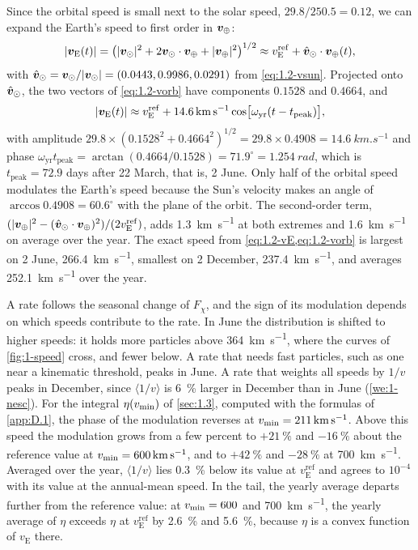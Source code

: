 Since the orbital speed is small next to the solar speed, $29.8/250.5 = 0.12$, we can expand the Earth's speed to first order in $\bm{v}_\oplus$:
\begin{equation*}
  |\bm{v}_{\mathrm{E}}(t)| = \bigl(|\bm{v}_\odot|^2 + 2\bm{v}_\odot\cdot\bm{v}_\oplus + |\bm{v}_\oplus|^2\bigr)^{1/2} \approx v_{\mathrm{E}}^{\mathrm{ref}} + \hat{\bm{v}}_\odot \cdot \bm{v}_\oplus(t),
\end{equation*}
with $\hat{\bm{v}}_\odot = \bm{v}_\odot/|\bm{v}_\odot| = (0.0443, 0.9986, 0.0291)$ from \cref{eq:1.2-vsun}. Projected onto $\hat{\bm{v}}_\odot$, the two vectors of \cref{eq:1.2-vorb} have components $0.1528$ and $0.4664$, and
\begin{equation}
  |\bm{v}_{\mathrm{E}}(t)| \approx v_{\mathrm{E}}^{\mathrm{ref}} + \SI{14.6}{km.s^{-1}} \cos\bigl[\omega_{\mathrm{yr}}(t - t_{\mathrm{peak}})\bigr],
  \label{eq:1.2-annual}
\end{equation}
with amplitude $29.8 \times (0.1528^2 + 0.4664^2)^{1/2} = 29.8 \times 0.4908 = \SI{14.6}{km.s^{-1}}$ and phase $\omega_{\mathrm{yr}} t_{\mathrm{peak}} = \arctan(0.4664/0.1528) = 71.9^\circ = \SI{1.254}{rad}$, which is $t_{\mathrm{peak}} = 72.9$ days after 22 March, that is, 2 June. Only half of the orbital speed modulates the Earth's speed because the Sun's velocity makes an angle of $\arccos 0.4908 = 60.6^\circ$ with the plane of the orbit. The second-order term, $(|\bm{v}_\oplus|^2 - (\hat{\bm{v}}_\odot\cdot\bm{v}_\oplus)^2)/(2v_{\mathrm{E}}^{\mathrm{ref}})$, adds \SI{1.3}{km.s^{-1}} at both extremes and \SI{1.6}{km.s^{-1}} on average over the year. The exact speed from \cref{eq:1.2-vE,eq:1.2-vorb} is largest on 2 June, \SI{266.4}{km.s^{-1}}, smallest on 2 December, \SI{237.4}{km.s^{-1}}, and averages \SI{252.1}{km.s^{-1}} over the year.

A rate follows the seasonal change of $F_\chi$, and the sign of its modulation depends on which speeds contribute to the rate. In June the distribution is shifted to higher speeds: it holds more particles above \SI{364}{km.s^{-1}}, where the curves of \cref{fig:1-speed} cross, and fewer below. A rate that needs fast particles, such as one near a kinematic threshold, peaks in June. A rate that weights all speeds by $1/v$ peaks in December, since $\langle 1/v \rangle$ is \SI{6}{\percent} larger in December than in June (\cref{we:1-nesc}). For the integral $\eta(v_{\mathrm{min}})$ of \cref{sec:1.3}, computed with the formulas of \cref{app:D.1}, the phase of the modulation reverses at $v_{\mathrm{min}} = \SI{211}{km.s^{-1}}$. Above this speed the modulation grows from a few percent to $+\SI{21}{\percent}$ and $\SI{-16}{\percent}$ about the reference value at $v_{\mathrm{min}} = \SI{600}{km.s^{-1}}$, and to $+\SI{42}{\percent}$ and $\SI{-28}{\percent}$ at \SI{700}{km.s^{-1}}. Averaged over the year, $\langle 1/v\rangle$ lies \SI{0.3}{\percent} below its value at $v_{\mathrm{E}}^{\mathrm{ref}}$ and agrees to $10^{-4}$ with its value at the annual-mean speed. In the tail, the yearly average departs further from the reference value: at $v_{\mathrm{min}} = 600$ and \SI{700}{km.s^{-1}}, the yearly average of $\eta$ exceeds $\eta$ at $v_{\mathrm{E}}^{\mathrm{ref}}$ by \SI{2.6}{\percent} and \SI{5.6}{\percent}, because $\eta$ is a convex function of $v_{\mathrm{E}}$ there.

